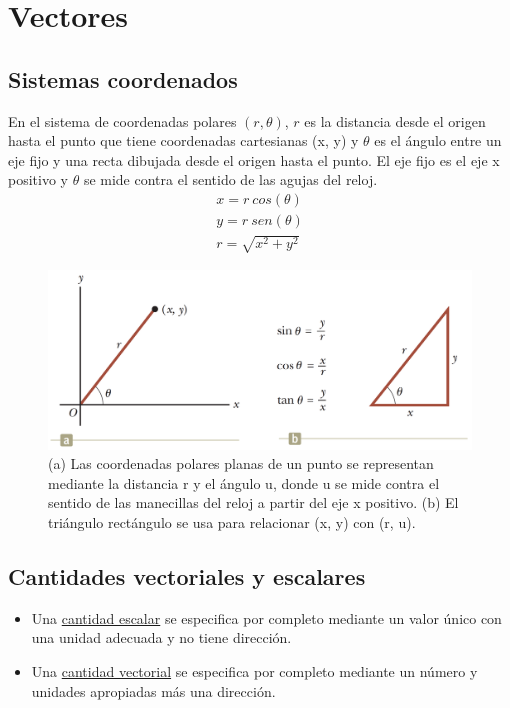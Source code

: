 \section{Vectores}
  \subsection{Sistemas coordenados}
    \PN En el sistema de coordenadas polares $(r, \theta)$, $r$ es la distancia desde el origen hasta el punto que tiene
    coordenadas cartesianas (x, y) y $\theta$ es el ángulo entre un eje fijo y una recta dibujada desde el origen hasta
    el punto. El eje fijo es el eje x positivo y $\theta$ se mide contra el sentido de las agujas del reloj.
    \begin{eqnarray*}
      x = r \ cos(\theta) \\
      y = r \ sen(\theta) \\
      r = \sqrt{x^{2} + y^{2}}
    \end{eqnarray*}

    \begin{figure}[H]
      \centering
      \includegraphics[scale=0.25]{1/graphics_3/figure_0}
      \caption{(a) Las coordenadas polares planas de un punto se representan mediante la distancia r y el ángulo u,
      donde u se mide contra el sentido de las manecillas del reloj a partir del eje x positivo. (b) El triángulo
      rectángulo se usa para relacionar (x, y) con (r, u).}
    \end{figure}

  \subsection{Cantidades vectoriales y escalares}
    \begin{itemize}
      \item Una \underline{cantidad escalar} se especifica por completo mediante un valor único con una unidad adecuada
        y no tiene dirección.
      \item Una \underline{cantidad vectorial} se especifica por completo mediante un número y unidades apropiadas más
        una dirección.
    \end{itemize}


